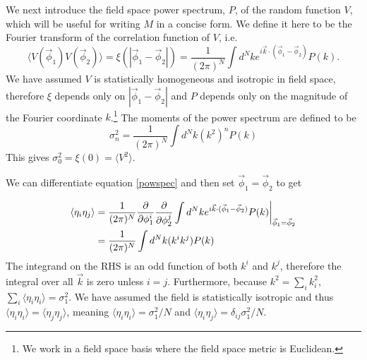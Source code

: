 \documentclass[12pt]{article}
\begin{document}
We next introduce the field space power spectrum, $P$, of the random function $V$, which will be useful for writing $M$ in a concise form. We define it here to be the Fourier transform of the correlation function of $V$, i.e.
%
\begin{equation}\label{powspec}
\langle V(\vec{\phi}_1) V(\vec{\phi}_2) \rangle = \xi(|\vec{\phi}_1-\vec{\phi}_2|)= \frac{1}{(2\pi)^N} \int d^Nk e^{i \vec{k} \cdot (\vec{\phi}_1-\vec{\phi}_2)} P(k).
\end{equation}
%
We have assumed $V$ is statistically homogeneous and isotropic in field space, therefore $\xi$ depends only on $|\vec{\phi}_1-\vec{\phi}_2|$ and  $P$ depends only on the magnitude of the Fourier coordinate $k$.\footnote{We work in a field space basis where the field space metric is Euclidean.} The moments of the power spectrum are defined to be
%
\begin{equation} \label{moments}
\sigma_n^2 = \frac{1}{(2\pi)^N}\int d^Nk (k^{2})^n P(k)
\end{equation}
%
This gives $\sigma_0^2=\xi(0)=\langle V^2 \rangle$.

We can differentiate equation \eqref{powspec} and then set $\vec{\phi}_1 = \vec{\phi}_2$ to get

\begin{align*}
\langle \eta_{i}\eta_{j}\rangle &= \frac{1}{(2\pi)^N} \frac{\partial}{\partial \phi_1^i}\frac{\partial}{\partial \phi_2^j} \int d^Nk e^{i \vec{k} \cdot (\vec{\phi}_1-\vec{\phi}_2)} P(k)\bigg{|}_{\vec{\phi}_1=\vec{\phi}_2}\\
&= \frac{1}{(2\pi)^N}\int d^Nk (k^i k^j) P(k)
\end{align*}
%
The integrand on the RHS is an odd function of both $k^i$ and $k^j$, therefore the integral over all $\vec{k}$ is zero unless $i=j$. Furthermore, because $k^2 = \sum_i k_i^2$,  $\sum_i \langle \eta_{i}\eta_{i}\rangle = \sigma_1^2$. We have assumed the field is statistically isotropic and thus $\langle \eta_{i}\eta_{i}\rangle=\langle \eta_{j}\eta_{j}\rangle$, meaning $\langle \eta_{i}\eta_{i}\rangle=\sigma_1^2/N$ and $\langle \eta_{i}\eta_{j}\rangle=\delta_{ij}\sigma_1^2/N$.

\end{document}
